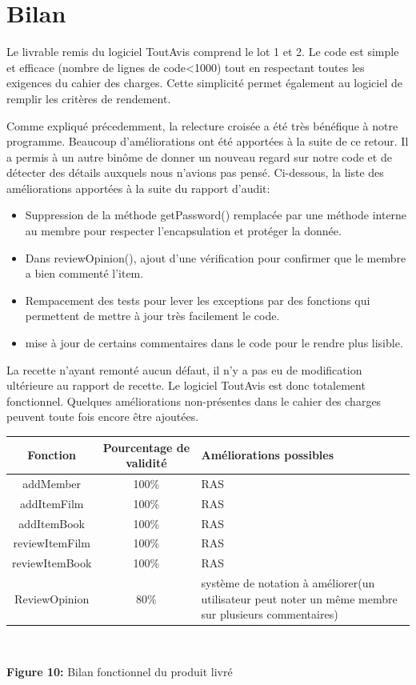 \documentclass[12pt,a4paper]{report}
\begin{document}
\chapter*{Bilan}
\label{chapter:Bilan} %
Le livrable remis du logiciel ToutAvis comprend le lot 1 et 2. Le code est simple et efficace (nombre de lignes de code<1000) tout en respectant toutes les exigences du cahier des charges. Cette simplicité permet également au logiciel de remplir les critères de rendement.

Comme expliqué précedemment, la relecture croisée a été très bénéfique à notre programme. Beaucoup d'améliorations ont été apportées à la suite de ce retour. Il a permis à un autre binôme de donner un nouveau regard sur notre code et de détecter des détails auxquels nous n'avions pas pensé. Ci-dessous, la liste des améliorations apportées à la suite du rapport d'audit:
\begin{itemize}
	\item	Suppression de la méthode getPassword() remplacée par une méthode interne au membre pour respecter l'encapsulation et protéger la donnée.
	\item	Dans reviewOpinion(), ajout d'une vérification pour confirmer que le membre a bien commenté l'item.
	\item	Rempacement des tests pour lever les exceptions par des fonctions qui permettent de mettre à jour très facilement le code. 
	\item	mise à jour de certains commentaires dans le code pour le rendre plus lisible.
\end{itemize}

La recette n'ayant remonté aucun défaut, il n'y a pas eu de modification ultérieure au rapport de recette.
Le logiciel ToutAvis est donc totalement fonctionnel. Quelques améliorations non-présentes dans le cahier des charges peuvent toute fois encore être ajoutées.

\begin{center}
\begin{tabular}{|c|c|p{6cm}|}
\hline 
Fonction & Pourcentage de validité & Améliorations possibles \\ 
\hline 
addMember & 100\% & RAS \\ 
\hline 
addItemFilm & 100\% & RAS \\ 
\hline 
addItemBook & 100\% & RAS \\ 
\hline 
reviewItemFilm & 100\% & RAS \\ 
\hline 
reviewItemBook & 100\% & RAS \\ 
\hline 
ReviewOpinion & 80\% & système de notation à améliorer(un utilisateur peut noter un même membre sur plusieurs commentaires)  \\ 
\hline 
\end{tabular}\\
\end{center}
\begin{center}
\textbf{Figure 10: }Bilan fonctionnel du produit livré
\end{center}
\end{document}
